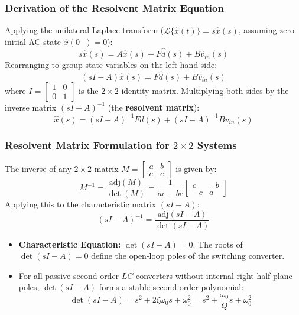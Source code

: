 \subsubsection{Derivation of the Resolvent Matrix Equation}
Applying the unilateral Laplace transform ($\mathcal{L}\{\dot{\hat{x}}(t)\} = s \hat{x}(s)$, assuming zero initial AC state $\hat{x}(0^-) = 0$):
\begin{equation}
s \hat{x}(s) = A \hat{x}(s) + F \hat{d}(s) + B \hat{v}_{in}(s)
\end{equation}
Rearranging to group state variables on the left-hand side:
\begin{equation}
(s I - A) \hat{x}(s) = F \hat{d}(s) + B \hat{v}_{in}(s)
\end{equation}
where $I = \begin{bmatrix} 1 & 0 \\ 0 & 1 \end{bmatrix}$ is the $2\times 2$ identity matrix. Multiplying both sides by the inverse matrix $(sI - A)^{-1}$ (the \textbf{resolvent matrix}):
\begin{equation}
\boxed{\hat{x}(s) = (s I - A)^{-1} F \hat{d}(s) + (s I - A)^{-1} B \hat{v}_{in}(s)}
\end{equation}

\subsubsection{Resolvent Matrix Formulation for $2\times 2$ Systems}
The inverse of any $2\times 2$ matrix $M = \begin{bmatrix} a & b \\ c & e \end{bmatrix}$ is given by:
\begin{equation}
M^{-1} = \frac{\text{adj}(M)}{\det(M)} = \frac{1}{a e - b c} \begin{bmatrix} e & -b \\ -c & a \end{bmatrix}
\end{equation}
Applying this to the characteristic matrix $(s I - A)$:
\begin{equation}
(s I - A)^{-1} = \frac{\text{adj}(s I - A)}{\det(s I - A)}
\end{equation}
\begin{itemize}
  \item \textbf{Characteristic Equation:} $\det(s I - A) = 0$. The roots of $\det(s I - A) = 0$ define the open-loop poles of the switching converter.
  \item For all passive second-order $LC$ converters without internal right-half-plane poles, $\det(s I - A)$ forms a stable second-order polynomial:
  \begin{equation}
  \det(s I - A) = s^2 + 2\zeta \omega_0 s + \omega_0^2 = s^2 + \frac{\omega_0}{Q} s + \omega_0^2
  \end{equation}
\end{itemize}

